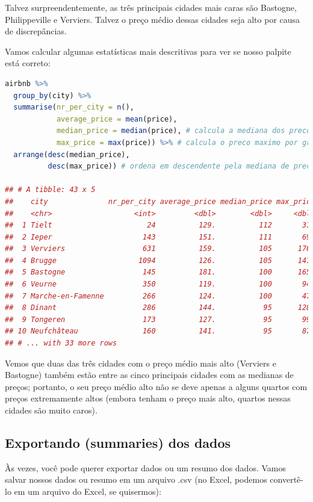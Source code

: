 \documentclass{article}
\begin{document}
Talvez surpreendentemente, as três principais cidades mais caras são Bastogne, Philippeville e Verviers. Talvez o preço médio dessas cidades seja alto por causa de discrepâncias. 

Vamos calcular algumas estatísticas mais descritivas para ver se nosso palpite está correto:

\begin{lstlisting}[language=R]
airbnb %>%
  group_by(city) %>%
  summarise(nr_per_city = n(), 
            average_price = mean(price),
            median_price = median(price), # calcula a mediana dos precos por grupo (city) 
            max_price = max(price)) %>% # calcula o preco maximo por grupo (city)
  arrange(desc(median_price),
          desc(max_price)) # ordena em descendente pela mediana de preco entao pelo preco maximo
          
## # A tibble: 43 x 5
##    city              nr_per_city average_price median_price max_price
##    <chr>                   <int>         <dbl>        <dbl>     <dbl>
##  1 Tielt                      24          129.          112       318
##  2 Ieper                     143          151.          111       695
##  3 Verviers                  631          159.          105      1769
##  4 Brugge                   1094          126.          105      1414
##  5 Bastogne                  145          181.          100      1650
##  6 Veurne                    350          119.          100       943
##  7 Marche-en-Famenne         266          124.          100       472
##  8 Dinant                    286          144.           95      1284
##  9 Tongeren                  173          127.           95       990
## 10 Neufchâteau               160          141.           95       872
## # ... with 33 more rows
\end{lstlisting}

Vemos que duas das três cidades com o preço médio mais alto (Verviers e Bastogne) também estão entre as cinco principais cidades com as medianas de preços; portanto, o seu preço médio alto não se deve apenas a alguns quartos com preços extremamente altos (embora tenham o preço mais alto, quartos nessas cidades são muito caros).

\subsection{Exportando (summaries) dos dados}

Às vezes, você pode querer exportar dados ou um resumo dos dados. Vamos salvar nossos dados ou resumo em um arquivo .csv (no Excel, podemos convertê-lo em um arquivo do Excel, se quisermos):
\end{document}
